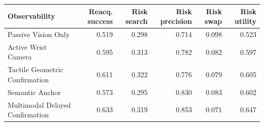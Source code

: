 \begin{tabular}{lrrrrr}
\toprule
Observability & Reacq. success & Risk search & Risk precision & Risk swap & Risk utility \\
\midrule
Passive Vision Only & 0.519 & 0.298 & 0.714 & 0.098 & 0.523 \\
Active Wrist Camera & 0.595 & 0.313 & 0.782 & 0.082 & 0.597 \\
Tactile Geometric Confirmation & 0.611 & 0.322 & 0.776 & 0.079 & 0.605 \\
Semantic Anchor & 0.573 & 0.295 & 0.830 & 0.083 & 0.602 \\
Multimodal Delayed Confirmation & 0.633 & 0.319 & 0.853 & 0.071 & 0.647 \\
\bottomrule
\end{tabular}
